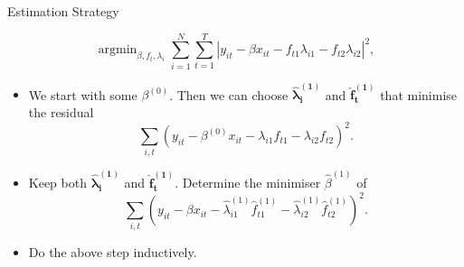 \documentclass{beamer}
\begin{document}
\begin{frame}{Estimation Strategy}

{\color{gray}\footnotesize \[
        \operatorname{argmin}_{\beta, f_t, \lambda_i} \sum_{i=1}^N\sum_{t=1}^T \left| y_{it}-\beta x_{it}-f_{t1}\lambda_{i1}-f_{t2}\lambda_{i2}\right|^2,
    \]}
    \begin{itemize}
        \item We start with some $\beta^{(0)}$. Then we can choose $\boldsymbol{\hat\lambda_i^{(1)}}$ and $\boldsymbol{\hat f_t^{(1)}}$ that minimise the residual
    \[
    \sum_{i,t}\left( y_{it}-\beta^{(0)}x_{it}- \lambda_{i1}f_{t1}-\lambda_{i2}f_{t2}\right)^2.
    \]
        \item Keep both $\boldsymbol{\hat\lambda_i^{(1)}}$ and $\boldsymbol{\hat f_t^{(1)}}$. Determine the minimiser $\hat \beta^{(1)}$ of
    \[
    \sum_{i,t} \left( y_{it}-\beta x_{it}- \hat \lambda_{i1}^{(1)}\hat f_{t1}^{(1)}-\hat \lambda^{(1)}_{i2}\hat f^{(1)}_{t2}\right)^2.
    \]
    \item Do the above step inductively.
    \end{itemize}


\end{frame}





\end{document}
